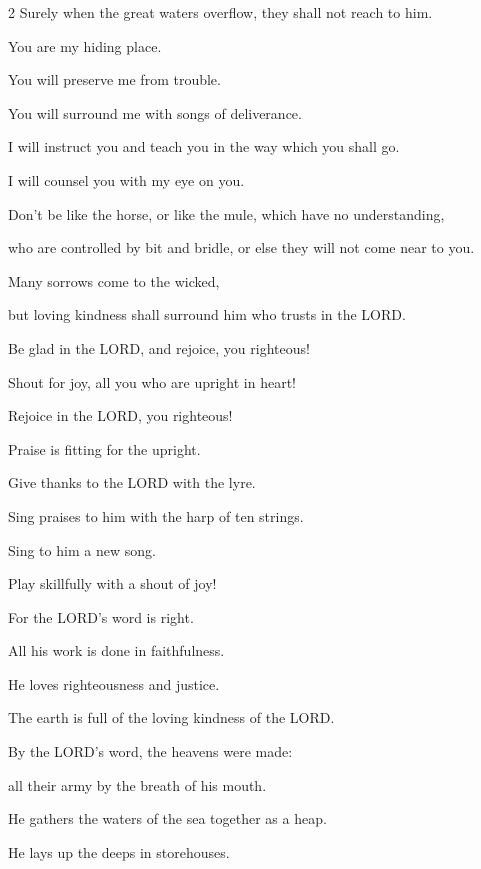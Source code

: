 \begin{multicols}{2}
	Surely when the great waters overflow, they shall not reach to him.
	
	
	\myverse{}You are my hiding place.
	
	You will preserve me from trouble.
	
	You will surround me with songs of deliverance.
	
	\vspace{\baselineskip}
	
	
	\myverse{}I will instruct you and teach you in the way which you shall
	go.
	
	I will counsel you with my eye on you.
	
	
	\myverse{}Don’t be like the horse, or like the mule, which have no understanding,
	
	who are controlled by bit and bridle, or else they will not come near to you.
	
	
	\myverse{}Many sorrows come to the wicked,
	
	but loving kindness shall surround him who trusts in the LORD.
	
	
	\myverse{}Be glad in the LORD, and rejoice, you righteous!
	
	Shout for joy, all you who are upright in heart!
	
	
	\mychapter{} \myverse*{}Rejoice in the LORD, you righteous!
	
	\quad\quad Praise is fitting for the upright.
	
	
	\myverse{}Give thanks to the LORD with the lyre.
	
	Sing praises to him with the harp of ten strings.
	
	
	\myverse{}Sing to him a new song.
	
	Play skillfully with a shout of joy!
	
	
	\myverse{}For the LORD’s word is right.
	
	All his work is done in faithfulness.
	
	
	\myverse{}He loves righteousness and justice.
	
	The earth is full of the loving kindness of the LORD.
	
	
	\myverse{}By the LORD’s word, the heavens were made:
	
	all their army by the breath of his mouth.
	
	
	\myverse{}He gathers the waters of the sea together as a heap.
	
	He lays up the deeps in storehouses.
	

\end{multicols}
